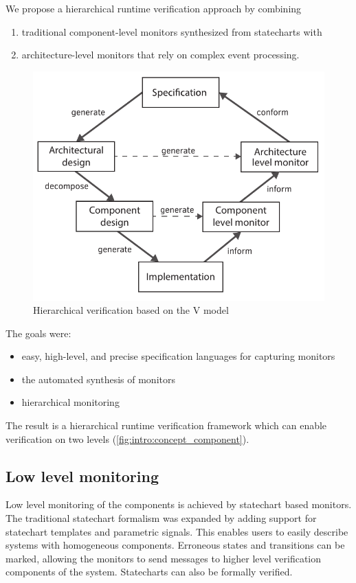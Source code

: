 We propose a hierarchical runtime verification approach by combining
\begin{enumerate}
\item traditional component-level monitors synthesized from statecharts with 
\item architecture-level monitors that rely on complex event processing.
\end{enumerate}

\begin{figure}[h]
	\centering
	\includegraphics[width=0.8\linewidth]{include/figures/chapter_1/rv_vmodel}
	\caption{Hierarchical verification based on the V model}
	\label{fig:intro:rvmodel}
\end{figure}


The goals were:
\begin{itemize}
\item easy, high-level, and precise specification languages for capturing monitors
\item the automated synthesis of monitors
\item hierarchical monitoring
\end {itemize}

The result is a hierarchical runtime verification framework which can enable verification on two levels (\cref{fig:intro:concept_component}).

\subsection{Low level monitoring}
Low level monitoring of the components is achieved by statechart based monitors. The traditional statechart formalism was expanded by adding support for statechart templates and parametric signals. This enables users to easily describe systems with homogeneous components. Erroneous states and transitions can be marked, allowing the monitors to send messages to higher level verification components of the system. Statecharts can also be formally verified.

